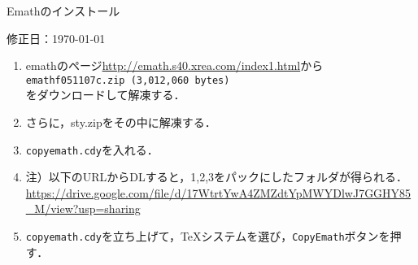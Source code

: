 \documentclass{ujarticle}
\begin{document}
\begin{center}
Emathのインストール
\end{center}

\vspace{-5mm}

\hfill 修正日：\today

\begin{enumerate}[\bf\large 1.]
\item emathのページ\url{http://emath.s40.xrea.com/index1.html}から\\
\hspace*{4zw}\verb|emathf051107c.zip (3,012,060 bytes)|\\
をダウンロードして解凍する．
\item さらに，sty.zipをその中に解凍する．
\item \verb|copyemath.cdy|を入れる．

\item[]\hspace*{1zw}注）以下のURLからDLすると，1,2,3をパックにしたフォルダが得られる．\\
\hspace*{4zw}\url{https://drive.google.com/file/d/17WtrtYwA4ZMZdtYpMWYDlwJ7GGHY85_M/view?usp=sharing}

\item \verb|copyemath.cdy|を立ち上げて，TeXシステムを選び，\verb|CopyEmath|ボタンを押す．
\end{enumerate}
\end{document}
